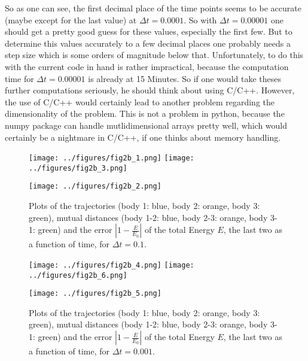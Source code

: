 \documentclass[12pt,a4paper]{article}
\begin{document}
\begin{enumerate}
		So as one can see, the first decimal place of the time points seems to be accurate (maybe except for the last value) at $\Delta t = 0.0001$. So with $\Delta t = 0.00001$ one should get a pretty good guess for these values, especially the first few. But to determine this values accurately to a few decimal places one probably needs a step size which is some orders of magnitude below that. Unfortunately, to do this with the current code in hand is rather impractical, because the computation time for $\Delta t = 0.00001$ is already at 15 Minutes. So if one would take theses further computations seriously, he should think about using C/C++. However, the use of C/C++ would certainly lead to another problem regarding the dimensionality of the problem. This is not a problem in python, because the numpy package can handle mutlidimensional arrays pretty well, which would certainly be a nightmare in C/C++, if one thinks about memory handling.
		
		\begin{figure}[H]
			\begin{center}
				\begin{minipage}[c]{0.49\textwidth}
					\texttt{[image: ../figures/fig2b\_1.png]}
					\texttt{[image: ../figures/fig2b\_3.png]}
				\end{minipage}
				\begin{minipage}[t]{0.49\textwidth}
					\texttt{[image: ../figures/fig2b\_2.png]}
				\end{minipage}
			\end{center}
			\caption{Plots of the trajectories (body 1: blue, body 2: orange, body 3: green), mutual distances (body 1-2: blue, body 2-3: orange, body 3-1: green) and the error $\left| 1 - \frac{E}{E_0} \right|$ of the total Energy $E$, the last two as a function of time, for $\Delta t = 0.1$.}
		\end{figure}
		
		\begin{figure}[H]
			\begin{center}
				\begin{minipage}[c]{0.49\textwidth}
					\texttt{[image: ../figures/fig2b\_4.png]}
					\texttt{[image: ../figures/fig2b\_6.png]}
				\end{minipage}
				\begin{minipage}[t]{0.49\textwidth}
					\texttt{[image: ../figures/fig2b\_5.png]}
				\end{minipage}
			\end{center}
			\caption{Plots of the trajectories (body 1: blue, body 2: orange, body 3: green), mutual distances (body 1-2: blue, body 2-3: orange, body 3-1: green) and the error $\left| 1 - \frac{E}{E_0} \right|$ of the total Energy $E$, the last two as a function of time, for $\Delta t = 0.001$.}
		\end{figure}
		

\end{enumerate}
\end{document}
